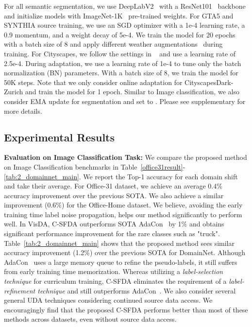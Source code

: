 \documentclass[10pt,twocolumn,letterpaper]{article}
\begin{document}
For all semantic segmentation, we use DeepLabV2~\cite{chen2017deeplab} with a ResNet101~\cite{he2016deep} backbone and initialize models with ImageNet-1K~\cite{deng2009imagenet} pre-trained weights. For GTA5 and SYNTHIA source training, we use an SGD optimizer with a 1e-4 learning rate, a 0.9 momentum, and a weight decay of 5e-4. We train the model for 20 epochs with a batch size of 8 and apply different weather augmentations~\cite{michaelis2019benchmarking} during training. For Cityscapes, we follow the settings in ~\cite{sakaridis2019guided} and use a learning rate of 2.5e-4. During adaptation, we use a learning rate of 1e-4 to tune only the batch normalization (BN) parameters. With a batch size of 8, we train the model for 50K steps. Note that we only consider online adaptation for CityscapesDark-Zurich and train the model for 1 epoch.  Similar to Image classification, we also consider EMA update for segmentation and set  to . Please see supplementary for more details.       





\vspace{-1mm}
\subsection{Experimental Results}
\vspace{-0.5mm}
\noindent \textbf{Evaluation on Image Classification Task:}
We compare the proposed method on Image Classification benchmarks in Table~\ref{office31result}-\ref{tab:2_domainnet_main}. We report the Top-1 accuracy for each domain shift and take their average. For Office-31 dataset, we achieve an average 0.4\% accuracy improvement over the previous SOTA. We also achieve a similar improvement (0.6\%) for the Office-Home dataset. We believe, avoiding the early training time label noise propagation, helps our method significantly to perform well. In VisDA, C-SFDA outperforms SOTA AdaCon~\cite{chen2022contrastive} by 1\% and obtains significant performance improvement for the rare classes such as "truck". Table~\ref{tab:2_domainnet_main} shows that the proposed method sees similar accuracy improvement (1.2\%) over the previous SOTA for DomainNet. Although AdaCon~\cite{chen2022contrastive} uses a large memory queue to refine the pseudo-labels, it still suffers from early training time memorization. Whereas utilizing a \emph{label-selection technique} for curriculum training, C-SFDA eliminates the requirement of a \emph{label-refinement technique} and still outperforms AdaCon~\cite{chen2022contrastive}. We also consider several general UDA techniques considering continued source data access. We encouragingly find that the proposed C-SFDA performs better than most of these methods across datasets, even without source data access. 
\renewcommand{\arraystretch}{1}
\end{document}
